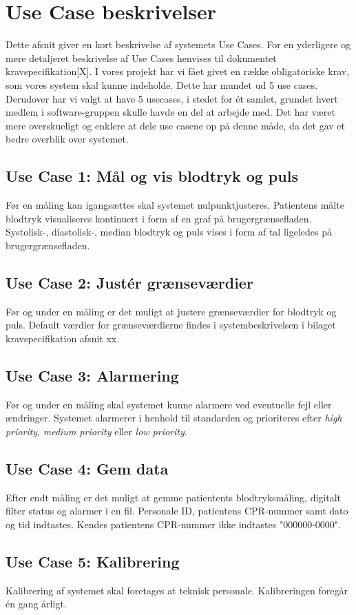 \section{Use Case beskrivelser}
Dette afsnit giver en kort beskrivelse af systemets Use Cases. For en yderligere og mere detaljeret beskrivelse af Use Cases henvises til dokumentet kravspecifikation[X]. I vores projekt har vi fået givet en række obligatoriske krav, som vores system skal kunne indeholde. Dette har mundet ud 5 use cases. Derudover har vi valgt at have 5 usecases, i stedet for ét samlet, grundet hvert medlem i software-gruppen skulle havde en del at arbejde med. Det har været mere overskueligt og enklere at dele use casene op på denne måde, da det gav et bedre overblik over systemet.
   
\subsection{Use Case 1: Mål og vis blodtryk og puls}
Før en måling kan igangsættes skal systemet nulpunktjusteres. Patientens målte blodtryk visualiseres kontinuert i form af en graf på brugergrænsefladen. Systolisk-, diastolisk-, median blodtryk og puls vises i form af tal ligeledes på brugergrænsefladen.
\subsection{Use Case 2: Justér grænseværdier}
Før og under en måling er det muligt at justere grænseværdier for blodtryk og puls. Default værdier for grænseværdierne findes i systembeskrivelsen i bilaget kravspecifikation afsnit xx.
\subsection{Use Case 3: Alarmering}
Før og under en måling skal systemet kunne alarmere ved eventuelle fejl eller ændringer. Systemet alarmerer i henhold til standarden og prioriteres efter \textit{high priority}, \textit{medium priority} eller \textit{low priority}.
\subsection{Use Case 4: Gem data}
Efter endt måling er det muligt at gemme patientents blodtryksmåling, digitalt filter status og alarmer i en fil. Personale ID, patientens CPR-nummer samt dato og tid indtastes. Kendes patientens CPR-nummer ikke indtastes "000000-0000".
\subsection{Use Case 5: Kalibrering}
Kalibrering af systemet skal foretages at teknisk personale. Kalibreringen foregår én gang årligt.
